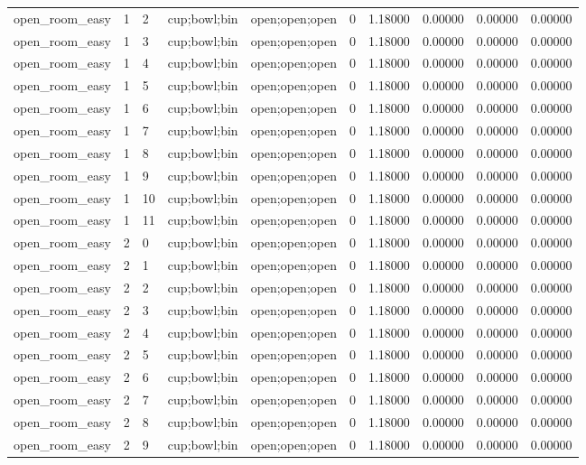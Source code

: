 \documentclass{article}
\begin{document}
\begin{table}[tbp]
{\begin{tabular}{llllllllll}
open\_room\_easy & 1 & 2 & cup;bowl;bin & open;open;open & 0 & 1.18000 & 0.00000 & 0.00000 & 0.00000 \\
open\_room\_easy & 1 & 3 & cup;bowl;bin & open;open;open & 0 & 1.18000 & 0.00000 & 0.00000 & 0.00000 \\
open\_room\_easy & 1 & 4 & cup;bowl;bin & open;open;open & 0 & 1.18000 & 0.00000 & 0.00000 & 0.00000 \\
open\_room\_easy & 1 & 5 & cup;bowl;bin & open;open;open & 0 & 1.18000 & 0.00000 & 0.00000 & 0.00000 \\
open\_room\_easy & 1 & 6 & cup;bowl;bin & open;open;open & 0 & 1.18000 & 0.00000 & 0.00000 & 0.00000 \\
open\_room\_easy & 1 & 7 & cup;bowl;bin & open;open;open & 0 & 1.18000 & 0.00000 & 0.00000 & 0.00000 \\
open\_room\_easy & 1 & 8 & cup;bowl;bin & open;open;open & 0 & 1.18000 & 0.00000 & 0.00000 & 0.00000 \\
open\_room\_easy & 1 & 9 & cup;bowl;bin & open;open;open & 0 & 1.18000 & 0.00000 & 0.00000 & 0.00000 \\
open\_room\_easy & 1 & 10 & cup;bowl;bin & open;open;open & 0 & 1.18000 & 0.00000 & 0.00000 & 0.00000 \\
open\_room\_easy & 1 & 11 & cup;bowl;bin & open;open;open & 0 & 1.18000 & 0.00000 & 0.00000 & 0.00000 \\
open\_room\_easy & 2 & 0 & cup;bowl;bin & open;open;open & 0 & 1.18000 & 0.00000 & 0.00000 & 0.00000 \\
open\_room\_easy & 2 & 1 & cup;bowl;bin & open;open;open & 0 & 1.18000 & 0.00000 & 0.00000 & 0.00000 \\
open\_room\_easy & 2 & 2 & cup;bowl;bin & open;open;open & 0 & 1.18000 & 0.00000 & 0.00000 & 0.00000 \\
open\_room\_easy & 2 & 3 & cup;bowl;bin & open;open;open & 0 & 1.18000 & 0.00000 & 0.00000 & 0.00000 \\
open\_room\_easy & 2 & 4 & cup;bowl;bin & open;open;open & 0 & 1.18000 & 0.00000 & 0.00000 & 0.00000 \\
open\_room\_easy & 2 & 5 & cup;bowl;bin & open;open;open & 0 & 1.18000 & 0.00000 & 0.00000 & 0.00000 \\
open\_room\_easy & 2 & 6 & cup;bowl;bin & open;open;open & 0 & 1.18000 & 0.00000 & 0.00000 & 0.00000 \\
open\_room\_easy & 2 & 7 & cup;bowl;bin & open;open;open & 0 & 1.18000 & 0.00000 & 0.00000 & 0.00000 \\
open\_room\_easy & 2 & 8 & cup;bowl;bin & open;open;open & 0 & 1.18000 & 0.00000 & 0.00000 & 0.00000 \\
open\_room\_easy & 2 & 9 & cup;bowl;bin & open;open;open & 0 & 1.18000 & 0.00000 & 0.00000 & 0.00000 \\
\bottomrule
\end{tabular}
}
\end{table}
\end{document}
